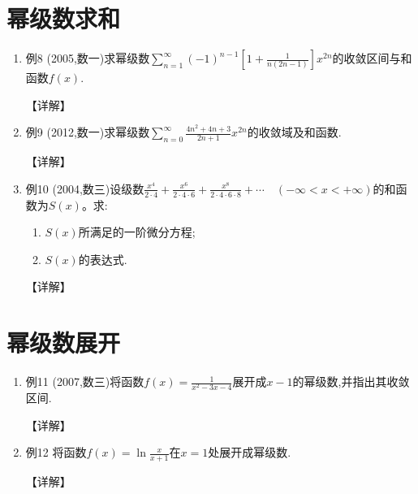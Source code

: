 \documentclass[12pt, a4paper, oneside, UTF8]{ctexbook}
\begin{document}
\section{幂级数求和}

\begin{enumerate}[label=\arabic*.,start=8]
    \item 例8 (2005,数一)求幂级数$\sum_{n=1}^{\infty}(-1)^{n-1}\left[1+\frac{1}{n(2n-1)}\right] x^{2n}$的收敛区间与和函数$f(x)$.
    
    \begin{solution}
    【详解】
    \end{solution}
    
    \item 例9 (2012,数一)求幂级数$\sum_{n=0}^{\infty}\frac{4n^2+4n+3}{2n+1} x^{2n}$的收敛域及和函数.
    
    \begin{solution}
    【详解】
    \end{solution}
    
    \item 例10 (2004,数三)设级数$\frac{x^4}{2\cdot 4}+\frac{x^6}{2\cdot 4\cdot 6}+\frac{x^8}{2\cdot 4\cdot 6\cdot 8}+\cdots\quad(-\infty<x<+\infty)$的和函数为$S(x)$。求:
    \begin{enumerate}[label=(\roman*)]
        \item $S(x)$所满足的一阶微分方程;
        \item $S(x)$的表达式.
    \end{enumerate}
    
    \begin{solution}
    【详解】
    \end{solution}
\end{enumerate}

\section{幂级数展开}

\begin{enumerate}[label=\arabic*.,start=11]
    \item 例11 (2007,数三)将函数$f(x)=\frac{1}{x^2-3x-4}$展开成$x-1$的幂级数,并指出其收敛区间.
    
    \begin{solution}
    【详解】
    \end{solution}
    
    \item 例12 将函数$f(x)=\ln\frac{x}{x+1}$在$x=1$处展开成幂级数.
    
    \begin{solution}
    【详解】
    \end{solution}
\end{enumerate}
\end{document}
